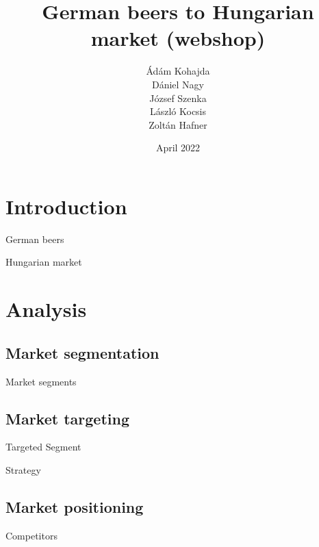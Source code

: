 \documentclass[aspectratio=169]{beamer}
\title[Group Assignment] %
{German beers to Hungarian market (webshop)}
\subtitle{}
\author[]
{Ádám Kohajda \\ Dániel Nagy \\ József Szenka \\ László Kocsis \\ Zoltán Hafner}
\date[April 2022] %
{April 2022}
\begin{document}
\begin{frame}[plain]
    \titlepage
\end{frame}


\section{Introduction}

\begin{frame}{German beers}

\end{frame}

\begin{frame}{Hungarian market}

\end{frame}


\section{Analysis}

\subsection{Market segmentation}
\begin{frame}{Market segments}

\end{frame}



\subsection{Market targeting}
\begin{frame}{Targeted Segment}

\end{frame}

\begin{frame}{Strategy}

\end{frame}



\subsection{Market positioning}
\begin{frame}{Competitors}

\end{frame}
\end{document}

